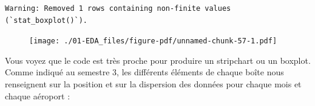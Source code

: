 \documentclass[
  a4paper,
  DIV=11,
  numbers=noendperiod,
  oneside]{scrreprt}
\begin{document}
\begin{verbatim}
Warning: Removed 1 rows containing non-finite values (`stat_boxplot()`).
\end{verbatim}

\begin{figure}[H]

{\centering \texttt{[image: ./01-EDA\_files/figure-pdf/unnamed-chunk-57-1.pdf]}

}

\end{figure}

Vous voyez que le code est très proche pour produire un stripchart ou un
boxplot. Comme indiqué au semestre 3, les différents éléments de chaque
boîte nous renseignent sur la position et sur la dispersion des données
pour chaque mois et chaque aéroport :
\end{document}
